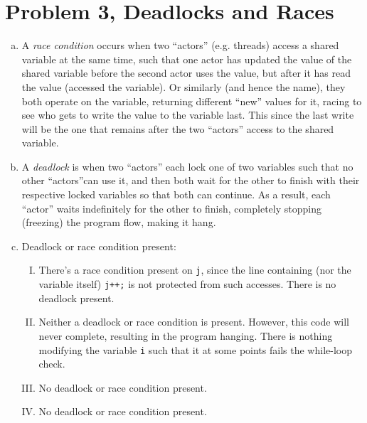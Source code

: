 \documentclass[fontsize=11pt, paper=a4, titlepage]{article}
\begin{document}
\section{Problem 3, Deadlocks and Races}
\begin{enumerate}[a)]

    \item A \textit{race condition} occurs when two ``actors'' (e.g. threads)
access a  shared variable at the same time, such that one actor has updated the
value of the shared variable before the second actor uses the value, but after
it has read the value (accessed the variable). Or similarly (and hence the
name), they both operate on the variable, returning different ``new'' values for
it, racing to see who gets to write the value to the variable last. This since
the last write will be the one that remains after the two ``actors'' access to
the shared variable.

    \item A \textit{deadlock} is when two ``actors'' each lock one of two
variables  such that no other ``actors''can use it, and then both wait for the
other to finish with their respective locked variables so that both can
continue. As a result, each ``actor'' waits indefinitely for the other to
finish, completely stopping (freezing) the program flow, making it hang.

    \item Deadlock or race condition present:
    \begin{enumerate}[I)]

        \item There's a race condition present on \lstinline!j!, since the line
containing (nor the variable itself) \lstinline!j++;! is not protected from such
accesses. There is no deadlock present.

        \item Neither a deadlock or race condition is present. However, this
code will never complete, resulting in the program hanging. There is nothing
modifying the variable \lstinline§i§ such that it at some points fails the
while-loop check.

        \item No deadlock or race condition present.

        \item No deadlock or race condition present.

    \end{enumerate}
\end{enumerate}
\end{document}
